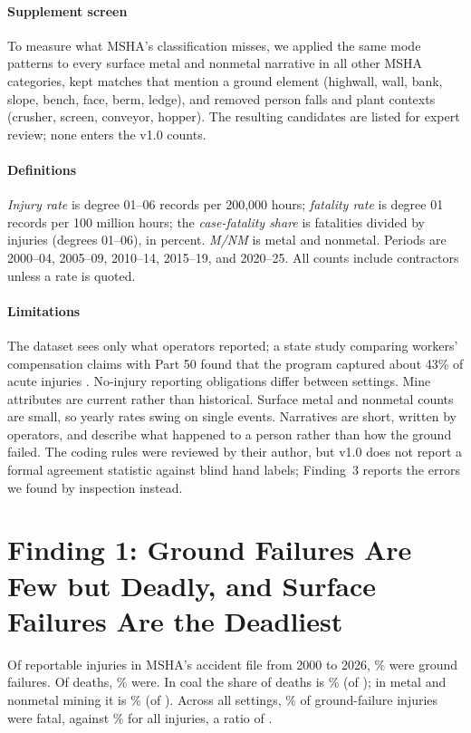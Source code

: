 \documentclass[letterpaper,twocolumn,10pt]{article}
\begin{document}
\paragraph{Supplement screen} To measure what MSHA's classification misses, we applied the same mode patterns to every surface metal and nonmetal narrative in all other MSHA categories, kept matches that mention a ground element (highwall, wall, bank, slope, bench, face, berm, ledge), and removed person falls and plant contexts (crusher, screen, conveyor, hopper). The resulting candidates are listed for expert review; none enters the v1.0 counts.

\paragraph{Definitions} \emph{Injury rate} is degree 01--06 records per 200,000 hours; \emph{fatality rate} is degree 01 records per 100 million hours; the \emph{case-fatality share} is fatalities divided by injuries (degrees 01--06), in percent. \emph{M/NM} is metal and nonmetal. Periods are 2000--04, 2005--09, 2010--14, 2015--19, and 2020--25. All counts include contractors unless a rate is quoted.

\paragraph{Limitations} The dataset sees only what operators reported; a state study comparing workers' compensation claims with Part 50 found that the program captured about 43\% of acute injuries \citep{Friedman2015}. No-injury reporting obligations differ between settings. Mine attributes are current rather than historical. Surface metal and nonmetal counts are small, so yearly rates swing on single events. Narratives are short, written by operators, and describe what happened to a person rather than how the ground failed. The coding rules were reviewed by their author, but v1.0 does not report a formal agreement statistic against blind hand labels; Finding~3 reports the errors we found by inspection instead.

\section{Finding 1: Ground Failures Are Few but Deadly, and Surface Failures Are the Deadliest}
Of \NAllInjury{} reportable injuries in MSHA's accident file from 2000 to 2026, \PctGFofInjury\% were ground failures. Of \NAllFatal{} deaths, \PctGFofFatal\% were. In coal the share of deaths is \PctGFofFatalCoal\% (of \NFatalCoal{}); in metal and nonmetal mining it is \PctGFofFatalMNM\% (of \NFatalMNM{}). Across all settings, \CFRGF\% of ground-failure injuries were fatal, against \CFRAll\% for all injuries, a ratio of \CFRRatio{}.
\end{document}
